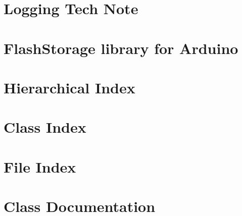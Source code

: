 \documentclass[twoside]{book}
\newcommand{\+}{\discretionary{\mbox{\scriptsize$\hookleftarrow$}}{}{}}
\begin{document}
\chapter{Logging Tech Note}
\label{md__c___users__javi__team__dropbox__javi__rodriguez__workspace_2__p_r_o_y_e_c_t_o_s__bitbucket_0d5e9337f75e6792ff305ef08d7fad0ac}

\chapter{Flash\+Storage library for Arduino}
\label{md__c___users__javi__team__dropbox__javi__rodriguez__workspace_2__p_r_o_y_e_c_t_o_s__bitbucket_09ea0d65c066462778ba41e07f3878ae9}

\chapter{Hierarchical Index}

\chapter{Class Index}

\chapter{File Index}

\chapter{Class Documentation}





















\end{document}

